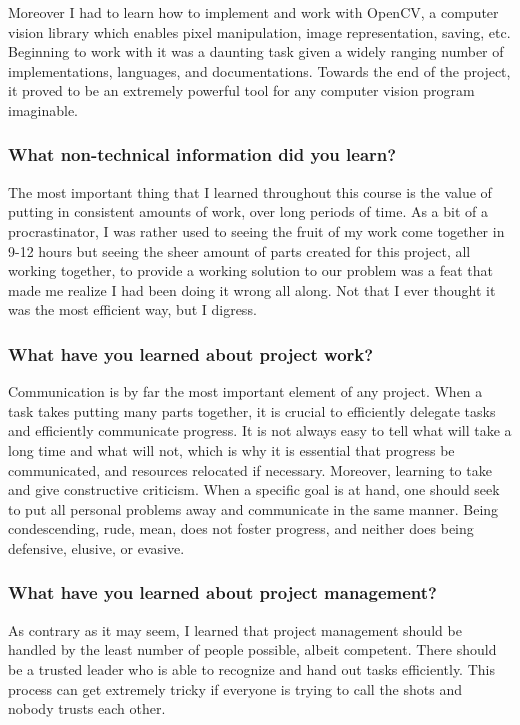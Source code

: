 \documentclass[article, onecolumn, draftclsnofoot,10pt, compsoc]{IEEEtran}
\begin{document}
Moreover I had to learn how to implement and work with OpenCV, a computer vision library which enables pixel manipulation, image representation, saving, etc. Beginning to work with it was a daunting task given a widely ranging number of implementations, languages, and documentations. Towards the end of the project, it proved to be an extremely powerful tool for any computer vision program imaginable. 

\subsubsection{What non-technical information did you learn?}
The most important thing that I learned throughout this course is the value of putting in consistent amounts of work, over long periods of time. As a bit of a procrastinator, I was rather used to seeing the fruit of my work come together in 9-12 hours but seeing the sheer amount of parts created for this project, all working together, to provide a working solution to our problem was a feat that made me realize I had been doing it wrong all along. Not that I ever thought it was the most efficient way, but I digress. 

\subsubsection{What have you learned about project work?}
Communication is by far the most important element of any project. When a task takes putting many parts together, it is crucial to efficiently delegate tasks and efficiently communicate progress. It is not always easy to tell what will take a long time and what will not, which is why it is essential that progress be communicated, and resources relocated if necessary. Moreover, learning to take and give constructive criticism. When a specific goal is at hand, one should seek to put all personal problems away and communicate in the same manner. Being condescending, rude, mean, does not foster progress, and neither does being defensive, elusive, or evasive. 

\subsubsection{What have you learned about project management?}
As contrary as it may seem, I learned that project management should be handled by the least number of people possible, albeit competent. There should be a trusted leader who is able to recognize and hand out tasks efficiently. This process can get extremely tricky if everyone is trying to call the shots and nobody trusts each other. 
\end{document}
